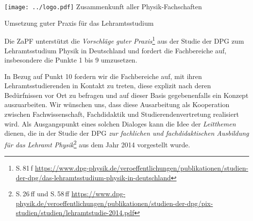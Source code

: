\documentclass[DIV=calc]{scrartcl}
\begin{document}
\hspace{0.87\textwidth}
\begin{minipage}{120pt}
\vspace{-1.8cm}
\texttt{[image: ../logo.pdf]}
\centering
\small Zusammenkunft aller Physik-Fachschaften
\end{minipage}

\begin{center}
  \huge{Umsetzung guter Praxis für das Lehramtsstudium}\vspace{.25\baselineskip}\\
  \normalsize
\end{center}
\vspace{1cm}







Die ZaPF unterstützt die \textit{Vorschläge guter Praxis}\footnote{S.\,81\,f \href{https://www.dpg-physik.de/veroeffentlichungen/publikationen/studien-der-dpg/das-lehramtsstudium-physik-in-deutschland}{https://www.dpg-physik.de/veroeffentlichungen/publikationen/studien-der-dpg/das-lehramtsstudium-physik-in-deutschland}} aus der Studie der DPG zum Lehramtsstudium Physik in Deutschland und fordert die Fachbereiche auf, insbesondere die Punkte 1 bis 9 umzusetzen.

In Bezug auf Punkt 10 fordern wir die Fachbereiche auf, mit ihren Lehramtsstudierenden in Kontakt zu treten, diese explizit nach deren Bedürfnissen vor Ort zu befragen und auf dieser Basis gegebenenfalls ein Konzept auszuarbeiten. Wir wünschen uns, dass diese Ausarbeitung als Kooperation zwischen Fachwissenschaft, Fachdidaktik und Studierendenvertretung realisiert wird. Als Ausgangspunkt eines solchen Dialoges kann die Idee der \textit{Leitthemen} dienen, die in der Studie der DPG \textit{zur fachlichen und fachdidaktischen Ausbildung für das Lehramt Physik}\footnote{S.\,26\,ff und S.\,58\,ff \href{https://www.dpg-physik.de/veroeffentlichungen/publikationen/studien-der-dpg/pix-studien/studien/lehramtstudie-2014.pdf}{https://www.dpg-physik.de/veroeffentlichungen/publikationen/studien-der-dpg/pix-studien/studien/lehramtstudie-2014.pdf}} aus dem Jahr 2014 vorgestellt wurde. 
\end{document}
